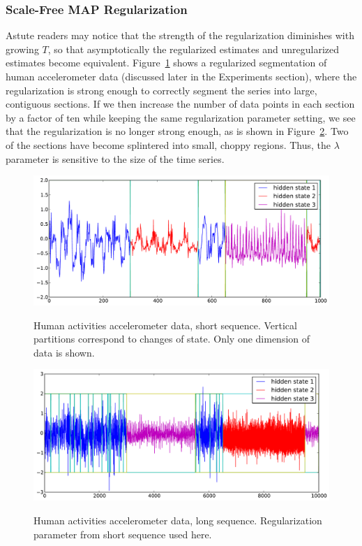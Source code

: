\documentclass[12pt]{article}
\begin{document}
\subsubsection{Scale-Free MAP Regularization}

Astute readers may notice that the strength of the regularization diminishes with growing $T$, so that asymptotically the regularized estimates and unregularized estimates become equivalent. Figure~\ref{fig:short-real-data} shows a regularized segmentation of human accelerometer data (discussed later in the Experiments section), where the regularization is strong enough to correctly segment the series into large, contiguous sections. If we then increase the number of data points in each section by a factor of ten while keeping the same regularization parameter setting, we see that the regularization is no longer strong enough, as is shown in Figure~\ref{fig:long-real-data}. Two of the sections have become splintered into small, choppy regions. Thus, the $\lambda$ parameter is sensitive to the size of the time series.

\begin{figure}[htbp]
  \caption{Human activities accelerometer data, short sequence. Vertical partitions correspond to changes of state. Only one dimension of data is shown.}
  \centering
    \includegraphics[width=0.8\linewidth]{images/MAP_results_hard_activity_short_3_states.pdf}
    \label{fig:short-real-data}
\end{figure}

\begin{figure}[htbp]
  \caption{Human activities accelerometer data, long sequence. Regularization parameter from short sequence used here.}
  \centering
    \includegraphics[width=0.8\linewidth]{images/MAP_results_hard_activity_long_3_states.pdf}
    \label{fig:long-real-data}
\end{figure}
\end{document}

